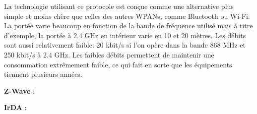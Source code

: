 La technologie utilisant ce protocole est conçue comme une alternative plus simple et moins chère que celles des autres WPANs, comme Bluetooth ou Wi-Fi. La portée varie beaucoup en fonction de la bande de fréquence utilisé mais à titre d'exemple, la portée à 2.4 GHz en intérieur varie en 10 et 20 mètres. Les débits sont aussi relativement faible: 20 kbit/s si l'on opère dans la bande 868 MHz et 250 kbit/s à 2.4 GHz. Les faibles débits permettent de maintenir une consommation extrêmement faible, ce qui fait en sorte que les équipements tiennent plusieurs années.

\textbf{Z-Wave} :

\textbf{IrDA} :